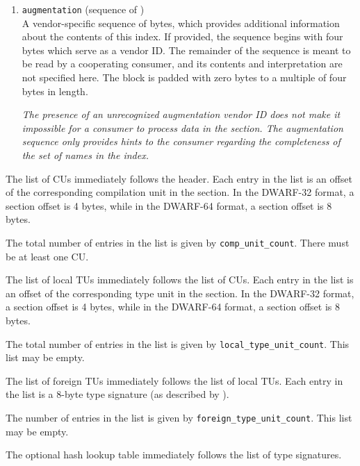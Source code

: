 \begin{enumerate}[1. ]
\item 
\bbeb
\texttt{augmentation} (sequence of \HFTubyte) \\
A vendor-specific 
\bb
sequence of bytes, 
\eb
which provides additional information about the contents of 
this index. If provided, the sequence begins with 
\bb
four bytes which serve as a
\eb
vendor ID. The remainder of the
\bb
sequence
\eb
is meant to be read by a cooperating consumer, and its
contents and interpretation are not specified here. The
\bb
block is padded with zero bytes 
\eb
to a multiple of four bytes in length.

\textit{The presence of an unrecognized augmentation 
\bb
vendor ID
\eb 
does not make it
impossible for a consumer to process data in the \dotdebugnames{} section.
The augmentation 
\db
sequence only provides hints to the consumer regarding
the completeness of the set of names in the index.
}

\end{enumerate}

The list of CUs immediately follows the header. Each entry in the 
list is an offset of the corresponding compilation unit
in the \dotdebuginfo{} section.
In the DWARF-32 format, a section offset is 4 bytes, 
while in the DWARF-64 format, a section offset is 8 bytes.

The total number of entries in the list is given by \texttt{comp\_unit\_count}.
There must be at least one CU.

The list of local TUs immediately follows the list of CUs. Each 
entry in the list is an offset of the corresponding type unit
in the \dotdebuginfo{} section. 
In the DWARF-32 format, a section offset is 4 bytes, 
while in the DWARF-64 format, a section offset is 8 bytes.

The total number of entries in the list is given by
\texttt{local\_type\_unit\_count}. This list may be empty.

The list of foreign TUs immediately follows the list of local TUs.
Each entry in the list is a 8-byte type signature (as described by
\DWFORMrefsigeight).

The number of entries in the list is given by \texttt{foreign\_type\_unit\_count}.
This list may be empty.

The optional hash lookup table immediately follows the list of type signatures.

